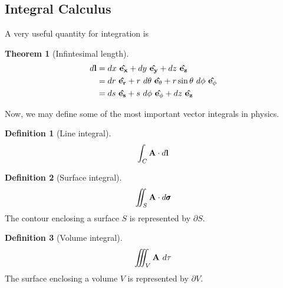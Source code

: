 \documentclass[10pt, a4paper]{extarticle}
\theoremstyle{definition}
\newtheorem{thm}{Theorem}
\newtheorem{defn}{Definition}
\numberwithin{equation}{subsection}
\begin{document}
\subsection{Integral Calculus}
A very useful quantity for integration is
\begin{framed}
	\begin{thm}[Infintesimal length]
		\begin{align}
			d\vb{l} & =dx\ \vu{e_x}+dy\ \vu{e_y}+dz\ \vu{e_z}                                 \\
			        & =dr\ \vu{e_r}+r\ d\theta\ \vu{e_\theta}+r\sin\theta\ d\phi\ \vu{e_\phi} \\
			        & =ds\ \vu{e_s}+s\ d\phi\ \vu{e_\phi}+dz\ \vu{e_z}
		\end{align}
	\end{thm}
\end{framed}
Now, we may define some of the most important vector integrals in physics.
\begin{framed}
	\begin{defn}[Line integral]
		\begin{equation*}\int_C \vb{A}\cdot d\vb{l}\end{equation*}
	\end{defn}

	\begin{defn}[Surface integral]
		\begin{equation*}\iint_S \vb{A}\cdot d\pmb{\sigma}\end{equation*}
		The contour enclosing a surface $S$ is represented by $\partial S$.
	\end{defn}

	\begin{defn}[Volume integral]
		\begin{equation*}\iiint_V \vb{A}\ d\tau\end{equation*}
		The surface enclosing a volume $V$ is represented by $\partial V$.
	\end{defn}
\end{framed}
\end{document}

